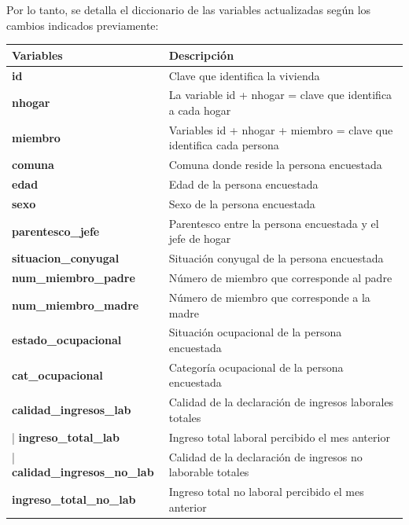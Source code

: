 \documentclass[a4paper]{article}
\begin{document}
    Por lo tanto, se detalla el diccionario de las variables actualizadas según los cambios indicados previamente:
    \begin{table}[H]
    \begin{tabular}{ll}
        \toprule
        \textbf{Variables}                     & \textbf{Descripción} \\ \midrule
        \textbf{id}                            & Clave que identifica la vivienda \\                            
        \textbf{nhogar}                        & La variable id + nhogar = clave que identifica a cada hogar \\ 
        \textbf{miembro}                       & Variables id + nhogar + miembro = clave que identifica  cada persona \\ 
        \textbf{comuna}                        & Comuna donde reside la persona encuestada \\ 
        \textbf{edad}                          & Edad de la persona encuestada \\             
        \textbf{sexo}                          & Sexo de la persona encuestada \\             
        \textbf{parentesco\_jefe}              & Parentesco entre la persona encuestada y el jefe de hogar \\ 
        \textbf{situacion\_conyugal}           & Situación conyugal de la persona encuestada \\               
        \textbf{num\_miembro\_padre}           & Número de miembro que corresponde al padre \\                
        \textbf{num\_miembro\_madre}           & Número de miembro que corresponde a la madre \\   
        \textbf{estado\_ocupacional}           & Situación ocupacional de la persona encuestada \\ 
        \textbf{cat\_ocupacional}              & Categoría ocupacional de la persona encuestada \\ 
        \textbf{calidad\_ingresos\_lab}        & Calidad de la declaración de ingresos laborales totales \\ |
        \textbf{ingreso\_total\_lab}           & Ingreso total laboral percibido el mes anterior \\         |
        \textbf{calidad\_ingresos\_no\_lab}    & Calidad de la declaración de ingresos no laborable totales \\
        \textbf{ingreso\_total\_no\_lab}       & Ingreso total no laboral percibido el mes anterior \\ 

\end{tabular}
\end{table}
\end{document}
